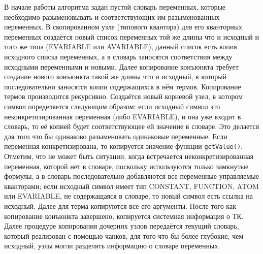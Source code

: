 В начале работы алгоритма задан пустой словарь переменных, которые необходимо разыменовывать и соответствующих им разыменованных переменных. В скопированном узле (типового квантора) для его кванторных переменных создаётся новый список переменных той же длины что и исходный и того же типа (EVARIABLE или AVARIABLE), данный список есть копия исходного списка переменных, а в словарь заносятся соответствия между исходными переменными и новыми. Далее копирование конъюнкта требует создание нового конъюнкта такой же длины что и исходный, в который последовательно заносятся копии содержащихся в нём термов. Копирование термов производится рекурсивно. Создаётся новый корневой узел, в котором символ определяется следующим образом:  если исходный символ это неконкретизированная переменная (либо EVARIABLE), и она уже входит в словарь, то её копией будет соответствующее ей значение в словаре. Это делается для того что бы одинаково разыменовать одинаковые переменные. Если переменная конкретизирована, то копируется значение функции {\tt getValue()}. Отметим, что не может быть ситуации, когда встречается неконкретизированная переменная, которой нет в словаре, поскольку используются только замкнутые формулы, а в словарь последовательно добавляются все переменные управляемые кванторами; если исходный символ имеет тип CONSTANT, FUNCTION, ATOM или EVARIABLE, не содержащаяся в словаре, то новый символ есть ссылка на исходный. Далее для терма копируются все его аргументы. После того как копирование конъюнкта завершено, копируется системная информация о ТК. Далее процедуре копирования дочерних узлов передаётся текущий словарь, который реализован с помощью чанков, для того что бы более глубокие, чем исходный, узлы могли разделять информацию о словаре переменных.

